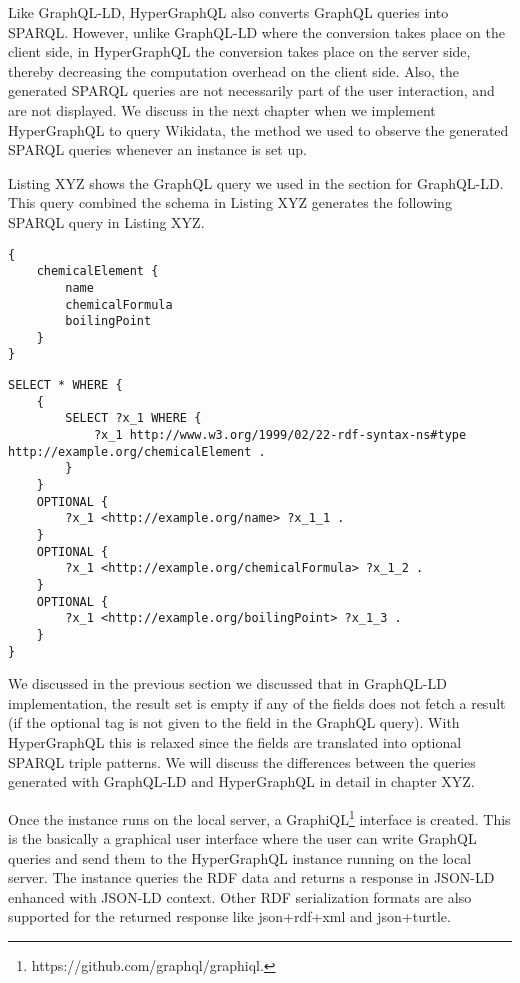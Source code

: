 Like GraphQL-LD, HyperGraphQL also converts GraphQL queries into SPARQL. However, unlike GraphQL-LD where the conversion takes place on the client side, in HyperGraphQL the conversion takes place on the server side, thereby decreasing the computation overhead on the client side. Also, the generated SPARQL queries are not necessarily part of the user interaction, and are not displayed. We discuss in the next chapter when we implement HyperGraphQL to query Wikidata, the method we used to observe the generated SPARQL queries whenever an instance is set up.

Listing XYZ shows the GraphQL query we used in the section for GraphQL-LD. This query combined the schema in Listing XYZ generates the following SPARQL query in Listing XYZ.


\begin{minipage}{\linewidth}
\begin{lstlisting}[label=listing:listing15, caption={An example query}]
{
	chemicalElement {
		name
		chemicalFormula
		boilingPoint
	}
}
\end{lstlisting}
\end{minipage}


\begin{minipage}{\linewidth}
\begin{lstlisting}[label=listing:listing16, caption={The generated SPARQL query}]
SELECT * WHERE { 
	{ 
   		SELECT ?x_1 WHERE { 
    		?x_1 http://www.w3.org/1999/02/22-rdf-syntax-ns#type http://example.org/chemicalElement . 
		}  
 	}  
 	OPTIONAL { 
 		?x_1 <http://example.org/name> ?x_1_1 . 
 	}  
	OPTIONAL { 
		?x_1 <http://example.org/chemicalFormula> ?x_1_2 . 
	}  
	OPTIONAL { 
		?x_1 <http://example.org/boilingPoint> ?x_1_3 . 
	}  
}
\end{lstlisting}
\end{minipage}

We discussed in the previous section we discussed that in GraphQL-LD implementation, the result set is empty if any of the fields does not fetch a result (if the optional tag is not given to the field in the GraphQL query). With HyperGraphQL this is relaxed since the fields are translated into optional SPARQL triple patterns. We will discuss the differences between the queries generated with GraphQL-LD and HyperGraphQL in detail in chapter XYZ.

Once the instance runs on the local server, a GraphiQL\footnote{https://github.com/graphql/graphiql.} interface is created. This is the basically a graphical user interface where the user can write GraphQL queries and send them to the HyperGraphQL instance running on the local server. The instance queries the RDF data and returns a response in JSON-LD enhanced with JSON-LD context. Other RDF serialization formats are also supported for the returned response like json+rdf+xml and json+turtle. 